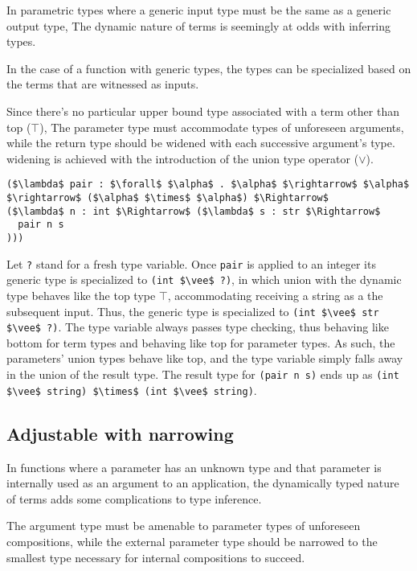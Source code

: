 \documentclass[sigplan]{acmart}
\theoremstyle{definition}
\begin{document}
In parametric types where a generic input type must be the same as a generic output type,
The dynamic nature of terms is seemingly at odds with inferring types.

In the case of a function with generic types, 
the types can be specialized based on the terms that are witnessed as inputs. 

Since there's no particular upper bound type associated with 
a term other than top ($\top$), 
The parameter type must accommodate types of unforeseen arguments, 
while the return type should be widened with each successive
argument's type.
widening is achieved with the introduction of the union type operator ($\vee$).

\begin{lstlisting}
($\lambda$ pair : $\forall$ $\alpha$ . $\alpha$ $\rightarrow$ $\alpha$ $\rightarrow$ ($\alpha$ $\times$ $\alpha$) $\Rightarrow$ 
($\lambda$ n : int $\Rightarrow$ ($\lambda$ s : str $\Rightarrow$ 
  pair n s
)))
\end{lstlisting}

Let \lstinline{?} stand for a fresh type variable.
Once \lstinline{pair} is applied to an integer its generic type is specialized to 
\lstinline{(int $\vee$ ?)}, 
in which union with the dynamic type behaves like the top type $\top$, 
accommodating receiving a string as a the subsequent input.
Thus, the generic type is specialized to 
\newline
\lstinline{(int $\vee$ str $\vee$ ?)}.
The type variable always passes type checking, 
thus behaving like bottom for term types
and behaving like top for parameter types.
As such, the parameters' union types behave like top,
and the type variable simply falls away in the union of the result type. 
The result type for \lstinline{(pair n s)} ends up as 
\newline
\lstinline{(int $\vee$ string) $\times$ (int $\vee$ string)}. 

\subsection{Adjustable with narrowing}

In functions where a parameter has an unknown type and that parameter is 
internally used as an argument to an application, the dynamically typed 
nature of terms adds some complications to type inference.

The argument type must be amenable to parameter types 
of unforeseen compositions,
while the external parameter type should be narrowed 
to the smallest type necessary for internal compositions to
succeed.
\end{document}
